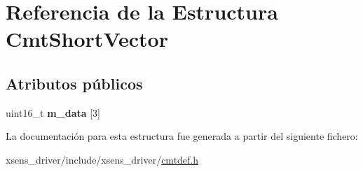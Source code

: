 \hypertarget{structCmtShortVector}{\section{\-Referencia de la \-Estructura \-Cmt\-Short\-Vector}
\label{structCmtShortVector}
}
\subsection*{\-Atributos públicos}
\begin{DoxyCompactItemize}
\item 
\hypertarget{structCmtShortVector_a064b88de919c405c6d3c62ea839ef7be}{uint16\-\_\-t {\bfseries m\-\_\-data} \mbox{[}3\mbox{]}}\label{structCmtShortVector_a064b88de919c405c6d3c62ea839ef7be}

\end{DoxyCompactItemize}


\-La documentación para esta estructura fue generada a partir del siguiente fichero\-:\begin{DoxyCompactItemize}
\item 
xsens\-\_\-driver/include/xsens\-\_\-driver/\hyperlink{cmtdef_8h}{cmtdef.\-h}\end{DoxyCompactItemize}
